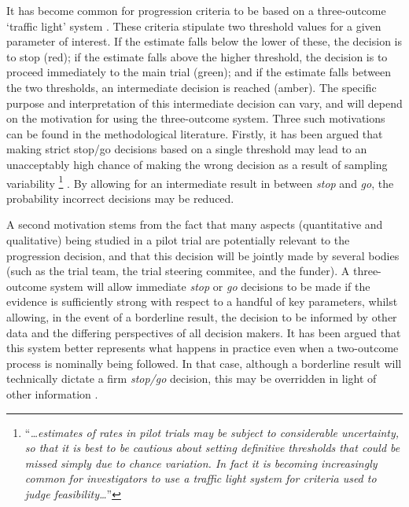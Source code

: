 \documentclass{bmcart}
\begin{document}
It has become common for progression criteria to be based on a three-outcome `traffic light' system \cite{Avery2017}. These criteria stipulate two threshold values for a given parameter of interest. If the estimate falls below the lower of these, the decision is to stop (red); if the estimate falls above the higher threshold, the decision is to proceed immediately to the main trial (green); and if the estimate falls between the two thresholds, an intermediate decision is reached (amber). The specific purpose and interpretation of this intermediate decision can vary, and will depend on the motivation for using the three-outcome system. Three such motivations can be found in the methodological literature. Firstly, it has been argued that making strict stop/go decisions based on a single threshold  may lead to an unacceptably high chance of making the wrong decision as a result of sampling variability \footnote{``\emph{\ldots estimates of rates in pilot trials may be subject to considerable uncertainty, so that it is best to be cautious about setting definitive thresholds that could be missed simply due to chance variation. In fact it is becoming increasingly common for investigators to use a traffic light system for criteria used to judge feasibility\ldots}''} \cite{Eldridge2016a}. By allowing for an intermediate result in between \emph{stop} and \emph{go}, the probability incorrect decisions may be reduced.


A second motivation stems from the fact that many aspects (quantitative and qualitative) being studied in a pilot trial are potentially relevant to the progression decision, and that this decision will be jointly made by several bodies (such as the trial team, the trial steering commitee, and the funder). A three-outcome system will allow immediate \emph{stop} or \emph{go} decisions to be made if the evidence is sufficiently strong with respect to a handful of key parameters, whilst allowing, in the event of a borderline result, the decision to be informed by other data and the differing perspectives of all decision makers. It has been argued that this system better represents what happens in practice even when a two-outcome process is nominally being followed. In that case, although a borderline result will technically dictate a firm \emph{stop/go} decision, this may be overridden in light of other information \cite{Sargent2001}.
\end{document}
